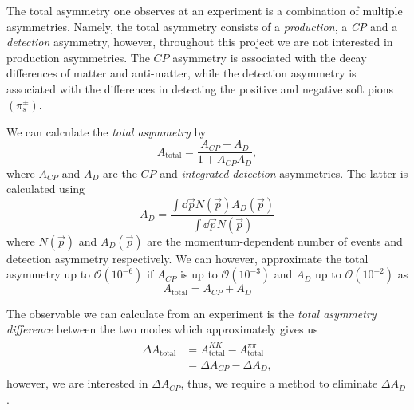 \documentclass{article}
\begin{document}
        The total asymmetry one observes at an experiment is a combination of multiple asymmetries.
        Namely, the total asymmetry consists of a \textit{production}, a \textit{CP} and a \textit{detection} asymmetry, however, throughout this project we are not interested in production asymmetries.
        The $CP$ asymmetry is associated with the decay differences of matter and anti-matter, while the detection asymmetry is associated with the differences in detecting the positive and negative soft pions $(\pi_s^\pm)$.
        
        We can calculate the \textit{total asymmetry} by
        \begin{equation}
                A_\text{total} = \frac{A_{CP} + A_D}{1 + A_{CP}A_D},
        \end{equation}
        where $A_{CP}$ and $A_D$ are the $CP$ and \textit{integrated detection} asymmetries.
        The latter is calculated using
        \begin{equation}
                A_D = \frac{\int \dd \vec{p} N(\vec{p})A_D(\vec{p})}{\int \dd \vec{p} N(\vec{p})}
        \end{equation}
        where $N(\vec{p})$ and $A_D(\vec{p})$ are the momentum-dependent number of events and detection asymmetry respectively.
        We can however, approximate the total asymmetry up to $\mathcal{O}(10^{-6})$ if $A_{CP}$ is up to $\mathcal{O}(10^{-3})$ and $A_D$ up to $\mathcal{O}(10^{-2})$ as
        \begin{equation}
                A_\text{total} = A_{CP} + A_{D}
        \end{equation}

        The observable we can calculate from an experiment is the \textit{total asymmetry difference} between the two modes which approximately gives us
        \begin{eqnarray}
                \begin{split}
                        \Delta A_\text{total} & = A^{KK}_\text{total} - A^{\pi\pi}_\text{total}\\
                        & = \Delta A_{CP} - \Delta A_D,
                \end{split}
        \end{eqnarray}
        however, we are interested in $\Delta A_{CP}$, thus, we require a method to eliminate $\Delta A_D$.
\end{document}
